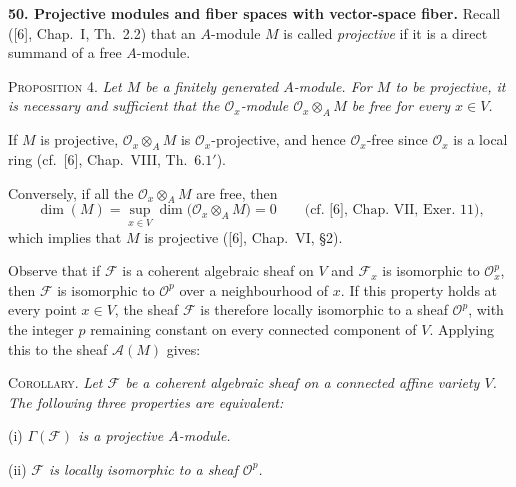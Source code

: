 
\medskip
{}\label{fac:II:4:no:50}
\textbf{50. Projective modules and fiber spaces with vector-space fiber.}
\label{fac:II:4:no:50:def:projective-module}
Recall ([6], Chap.~I, Th.~2.2) that an $A$-module $M$ is called
\textit{projective} if it is a direct summand of a free $A$-module.

\label{fac:II:4:prop:4}
\textsc{Proposition 4.}
\textit{Let $M$ be a finitely generated $A$-module. For $M$ to be
projective, it is necessary and sufficient that the
$\mathcal{O}_x$-module $\mathcal{O}_x\otimes_A M$ be free for every
$x\in V$.}

If $M$ is projective, $\mathcal{O}_x\otimes_A M$ is
$\mathcal{O}_x$-projective, and hence $\mathcal{O}_x$-free since
$\mathcal{O}_x$ is a local ring (cf.~[6], Chap.~VIII, Th.~$6.1'$).

Conversely, if all the $\mathcal{O}_x\otimes_A M$ are free, then
\label{fac:II:4:prop:4:formula:projective-dimension}
\[
\dim(M)=\sup_{x\in V}\dim\bigl(\mathcal{O}_x\otimes_A M\bigr)=0
\qquad\text{(cf.~[6], Chap.~VII, Exer.~11),}
\]
which implies that $M$ is projective ([6], Chap.~VI, \S2).

Observe that if $\mathcal{F}$ is a coherent algebraic sheaf on $V$ and
$\mathcal{F}_x$ is isomorphic to $\mathcal{O}_x^p$, then $\mathcal{F}$ is
isomorphic to $\mathcal{O}^p$ over a neighbourhood of $x$. If this property
holds at every point $x\in V$, the sheaf $\mathcal{F}$ is therefore locally
isomorphic to a sheaf $\mathcal{O}^p$, with the integer $p$ remaining constant
on every connected component of $V$. Applying this to the sheaf
$\mathcal{A}(M)$ gives:

\label{fac:II:4:no:50:cor}
\textsc{Corollary.}
\textit{Let $\mathcal{F}$ be a coherent algebraic sheaf on a connected affine
variety $V$. The following three properties are equivalent:}

\label{fac:II:4:no:50:cor:i}
\noindent(i) \textit{$\Gamma(\mathcal{F})$ is a projective $A$-module.}

\label{fac:II:4:no:50:cor:ii}
\par\noindent(ii) \textit{$\mathcal{F}$ is locally isomorphic to a sheaf
$\mathcal{O}^p$.}

